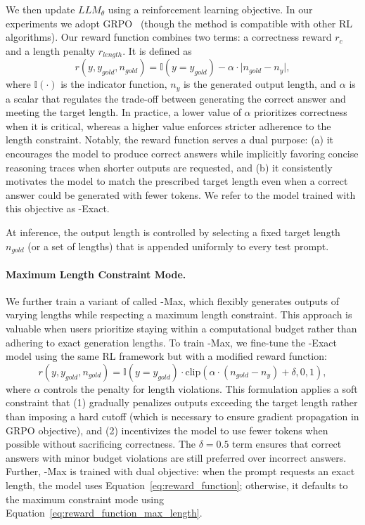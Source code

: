 We then update $LLM_{\theta}$ using a reinforcement learning objective. In our experiments we adopt GRPO~\citep{shao2024deepseekmathpushinglimitsmathematical} (though the method is compatible with other RL algorithms). Our reward function combines two terms: a correctness reward $r_c$ and a length penalty $r_{length}$. It is defined as
\begin{equation}
r(y, y_{gold}, n_{gold}) = \mathbb{I}(y = y_{gold}) - \alpha \cdot \bigl|n_{gold} - n_y\bigr|,
\label{eq:reward_function}
\end{equation}
where $\mathbb{I}(\cdot)$ is the indicator function, $n_y$ is the generated output length, and $\alpha$ is a scalar that regulates the trade-off between generating the correct answer and meeting the target length. In practice, a lower value of $\alpha$ prioritizes correctness when it is critical, whereas a higher value enforces stricter adherence to the length constraint. Notably, the reward function serves a dual purpose: (a) it encourages the model to produce correct answers while implicitly favoring concise reasoning traces when shorter outputs are requested, and (b) it consistently motivates the model to match the prescribed target length even when a correct answer could be generated with fewer tokens. We refer to the model trained with this objective as \model{}-Exact.

At inference, the output length is controlled by selecting a fixed target length $n_{gold}$ (or a set of lengths) that is appended uniformly to every test prompt.

\paragraph{Maximum Length Constraint Mode.}

We further train a variant of \model{} called \model{}-Max, which flexibly generates outputs of varying lengths while respecting a maximum length constraint. This approach is valuable when users prioritize staying within a computational budget rather than adhering to exact generation lengths. To train \model{}-Max, we fine-tune the \model{}-Exact model using the same RL framework but with a modified reward function:
\begin{equation}
r(y, y_{gold}, n_{gold}) = \mathbb{I}(y = y_{gold}) \cdot \text{clip}(\alpha \cdot (n_{gold} - n_y) + \delta, 0, 1),
\label{eq:reward_function_max_length}
\end{equation}
where $\alpha$ controls the penalty for length violations. This formulation applies a soft constraint that (1) gradually penalizes outputs exceeding the target length rather than imposing a hard cutoff (which is necessary to ensure gradient propagation in GRPO objective), and (2) incentivizes the model to use fewer tokens when possible without sacrificing correctness. The $\delta = 0.5$ term ensures that correct answers with minor budget violations are still preferred over incorrect answers.
Further, \model{}-Max is trained with dual objective: when the prompt requests an exact length, the model uses Equation~\ref{eq:reward_function}; otherwise, it defaults to the maximum constraint mode using Equation~\ref{eq:reward_function_max_length}.


